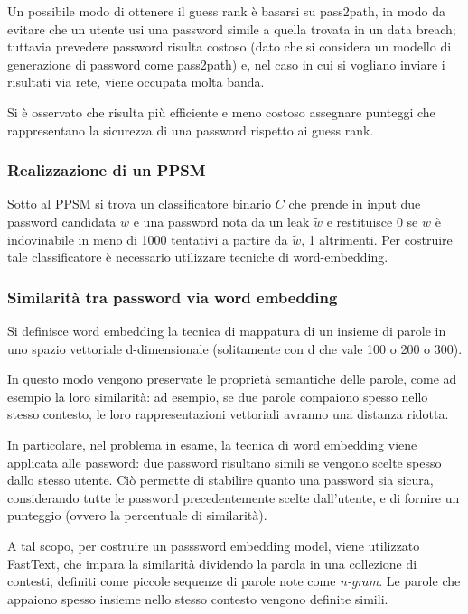 Un possibile modo di ottenere il guess rank è basarsi su pass2path, in modo da evitare che un utente usi una password simile a quella trovata in un data breach; tuttavia prevedere password risulta costoso (dato che si considera un modello di generazione di password come pass2path) e, nel caso in cui si vogliano inviare i risultati via rete, viene occupata molta banda. 

Si è osservato che risulta più efficiente e meno costoso assegnare punteggi che rappresentano la sicurezza di una password rispetto ai guess rank.

\subsubsection{Realizzazione di un PPSM}
Sotto al PPSM si trova un classificatore binario $C$ che prende in input due password candidata $w$ e una password nota da un leak $\tilde{w}$ e restituisce 0 se $w$ è indovinabile in meno di 1000 tentativi a partire da $\tilde{w}$, 1 altrimenti.
Per costruire tale classificatore è necessario utilizzare tecniche di word-embedding.

\subsubsection{Similarità tra password via word embedding}

Si definisce word embedding la tecnica di mappatura di un insieme di parole in uno spazio vettoriale d-dimensionale (solitamente con d che vale 100 o 200 o 300).

In questo modo vengono preservate le proprietà semantiche delle parole, come ad esempio la loro similarità: ad esempio, se due parole compaiono spesso nello stesso contesto, le loro rappresentazioni vettoriali avranno una distanza ridotta.

In particolare, nel problema in esame, la tecnica di word embedding viene applicata alle password: due password risultano simili se vengono scelte spesso dallo stesso utente. Ciò permette di stabilire quanto una password sia sicura, considerando tutte le password precedentemente scelte dall'utente, e di fornire un punteggio (ovvero la percentuale di similarità).

A tal scopo, per costruire un passsword embedding model, viene utilizzato FastText, che impara la similarità dividendo la parola in una collezione di contesti, definiti come piccole sequenze di parole note come \emph{n-gram}. Le parole che appaiono spesso insieme nello stesso contesto vengono definite simili.

